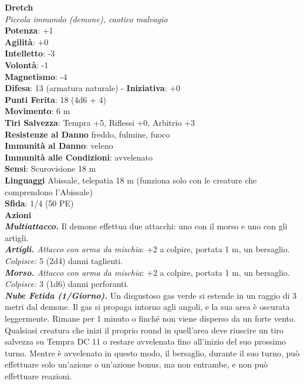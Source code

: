 \begin{multicols}{2}
\medskip\textbf{Dretch}\\
\emph{Piccola immondo (demone), caotico malvagio}\\
\textbf{Potenza}: +1\\
\textbf{Agilità}: +0\\
\textbf{Intelletto}: -3\\
\textbf{Volontà}: -1\\
\textbf{Magnetismo}: -4\\
\textbf{Difesa}: 13 (armatura naturale) - \textbf{Iniziativa}: +0\\
\textbf{Punti Ferita}: 18 (4d6 + 4)\\
\textbf{Movimento}: 6 m\\
\textbf{Tiri Salvezza}: Tempra +5, Riflessi +0, Arbitrio +3\\
\textbf{Resistenze al Danno} freddo, fulmine, fuoco\\
\textbf{Immunità al Danno}: veleno\\
\textbf{Immunità alle Condizioni}: avvelenato\\
\textbf{Sensi}: Scurovisione 18 m\\
\textbf{Linguaggi} Abissale, telepatia 18 m (funziona solo con le creature che comprendono l'Abissale)\\
\textbf{Sfida}: 1/4 (50 PE)\smallskip\\
\smallskip\textbf{Azioni}\\
\emph{\textbf{Multiattacco.}} Il demone effettua due attacchi: uno con il morso e uno con gli artigli.\\
\emph{\textbf{Artigli.} Attacco con arma da mischia}: +2 a colpire, portata 1 m, un bersaglio.\\
\emph{Colpisce:} 5 (2d4) danni taglienti.\\
\emph{\textbf{Morso.} Attacco con arma da mischia}: +2 a colpire, portata 1 m, un bersaglio.\\
\emph{Colpisce:} 3 (1d6) danni perforanti.\\
\emph{\textbf{Nube Fetida (1/Giorno).}} Un disgustoso gas verde si estende in un raggio di 3 metri dal demone. Il gas si propaga intorno agli angoli, e la sua area è oscurata leggermente. Rimane per 1 minuto o finché non viene disperso da un forte vento. Qualsiasi creatura che inizi il proprio round in quell'area deve riuscire un tiro salvezza su Tempra DC 11 o restare avvelenata fino all'inizio del suo prossimo turno. Mentre è avvelenato in questo modo, il bersaglio, durante il suo turno, può effettuare solo un'azione o un'azione bonus, ma non entrambe, e non può effettuare reazioni.\\

\end{multicols}
